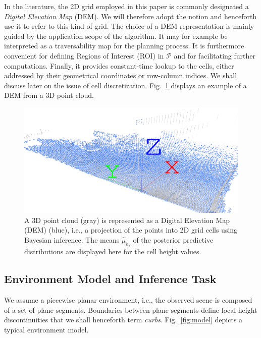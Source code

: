 In the literature, the 2D grid employed in this paper is commonly designated a
\emph{Digital Elevation Map} (DEM). We will therefore adopt the notion and
henceforth use it to refer to this kind of grid. The choice of a DEM
representation is mainly guided by the application scope of the algorithm. It
may for example be interpreted as a traversability map for the planning process.
It is furthermore convenient for defining Regions of Interest (ROI) in
$\mathcal{P}$ and for facilitating further computations. Finally, it provides
constant-time lookup to the cells, either addressed by their geometrical
coordinates or row-column indices. We shall discuss later on the issue of
cell discretization. Fig.~\ref{fig:dem} displays an example of a DEM from a 3D
point cloud.

\begin{figure}[t]
\centering
\includegraphics[width=\columnwidth]{fig/dem.eps}
\caption{A 3D point cloud (gray) is represented as a Digital Elevation Map (DEM)
(blue), i.e., a projection of the points into 2D grid cells using Bayesian
inference. The means $\hat{\mu}_{h_i}$ of the posterior predictive distributions
are displayed here for the cell height values.}
\label{fig:dem}
\end{figure}

\subsection{Environment Model and Inference Task}

We assume a piecewise planar environment, i.e., the observed scene is composed
of a set of plane segments. Boundaries between plane segments define local
height discontinuities that we shall henceforth term \emph{curbs}.
Fig.~\ref{fig:model} depicts a typical environment model.

